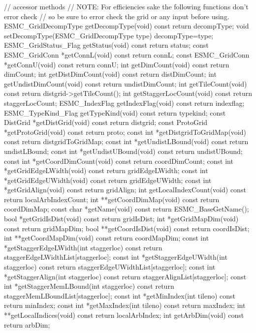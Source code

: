 {{   // accessor methods
   // NOTE: For efficiencies sake the following functions don't error check
   //       so be sure to error check the grid or any input before using.  
   ESMC_GridDecompType getDecompType(void) const {return decompType;}
   void setDecompType(ESMC_GridDecompType type) {decompType=type;}
   ESMC_GridStatus_Flag getStatus(void) const {return status;}
   const ESMC_GridConn *getConnL(void) const {return connL;}
   const ESMC_GridConn *getConnU(void) const {return connU;} 
   int getDimCount(void) const {return dimCount;}
   int getDistDimCount(void) const {return distDimCount;}
   int getUndistDimCount(void) const {return undistDimCount;}
   int getTileCount(void) const {return distgrid->getTileCount();}
   int getStaggerLocCount(void) const {return staggerLocCount;}
   ESMC_IndexFlag getIndexFlag(void) const {return indexflag;}
   ESMC_TypeKind_Flag getTypeKind(void) const {return typekind;}
   const DistGrid *getDistGrid(void) const {return distgrid;}
   const ProtoGrid *getProtoGrid(void) const {return proto;}
   const int *getDistgridToGridMap(void) const {return distgridToGridMap;}
   const int *getUndistLBound(void) const {return undistLBound;}
   const int *getUndistUBound(void) const {return undistUBound;}
   const int *getCoordDimCount(void) const {return coordDimCount;}
   const int *getGridEdgeLWidth(void) const {return gridEdgeLWidth;}
   const int *getGridEdgeUWidth(void)  const {return gridEdgeUWidth;}
   const int *getGridAlign(void) const {return gridAlign;}
         int getLocalIndexCount(void) const {return localArbIndexCount;}
         int **getCoordDimMap(void) const {return coordDimMap;}
   const char *getName(void)  const {return ESMC_BaseGetName();}
         bool *getGridIsDist(void) const {return gridIsDist;} 
         int  *getGridMapDim(void) const {return gridMapDim;} 
         bool **getCoordIsDist(void) const {return coordIsDist;} 
         int  **getCoordMapDim(void) const {return coordMapDim;} 
   const int   *getStaggerEdgeLWidth(int staggerloc) const {return staggerEdgeLWidthList[staggerloc];}
   const int   *getStaggerEdgeUWidth(int staggerloc) const {return staggerEdgeUWidthList[staggerloc];}
   const int   *getStaggerAlign(int staggerloc) const {return staggerAlignList[staggerloc];}
   const int   *getStaggerMemLBound(int staggerloc) const {return staggerMemLBoundList[staggerloc];}
   const int   *getMinIndex(int tileno) const { return minIndex; }
   const int   *getMaxIndex(int tileno) const { return maxIndex; }
         int  **getLocalIndices(void) const { return localArbIndex;}
         int   getArbDim(void) const { return arbDim;}
 
}}
